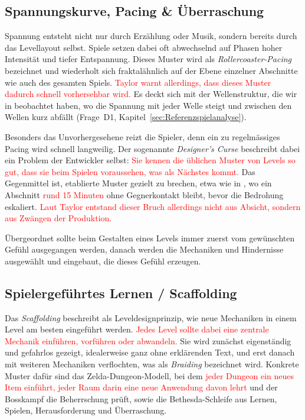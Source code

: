\documentclass[../Main.tex]{subfiles}
\begin{document}
\subsection{Spannungskurve, Pacing \& Überraschung} \label{sec:Pacing}
Spannung entsteht nicht nur durch Erzählung oder Musik, sondern bereits durch das Levellayout selbst. Spiele setzen dabei oft abwechselnd auf Phasen hoher Intensität und tiefer Entspannung. Dieses Muster wird als \textit{Rollercoaster-Pacing} bezeichnet und wiederholt sich fraktalähnlich auf der Ebene einzelner Abschnitte wie auch des gesamten Spiels. \textcolor{red}{Taylor warnt allerdings, dass dieses Muster dadurch schnell vorhersehbar wird.}\autocite{gdc_tenprinciples2010} Es deckt sich mit der Wellenstruktur, die wir in  beobachtet haben, wo die Spannung mit jeder Welle steigt und zwischen den Wellen kurz abfällt (Frage~D1, Kapitel~\ref{sec:Referenzspielanalyse}).

Besonders das Unvorhergesehene reizt die Spieler, denn ein zu regelmässiges Pacing wird schnell langweilig. Der sogenannte \textit{Designer's Curse} beschreibt dabei ein Problem der Entwickler selbst: \textcolor{red}{Sie kennen die üblichen Muster von Levels so gut, dass sie beim Spielen voraussehen, was als Nächstes kommt.} Das Gegenmittel ist, etablierte Muster gezielt zu brechen, etwa wie in ,\autocite{visceral_deadspace2_2011} wo ein Abschnitt \textcolor{red}{rund 15 Minuten} ohne Gegnerkontakt bleibt, bevor die Bedrohung eskaliert. \textcolor{red}{Laut Taylor entstand dieser Bruch allerdings nicht aus Absicht, sondern aus Zwängen der Produktion.}\autocite{gdc_tenprinciples2010}

Übergeordnet sollte beim Gestalten eines Levels immer zuerst vom gewünschten Gefühl ausgegangen werden, danach werden die Mechaniken und Hindernisse ausgewählt und eingebaut, die dieses Gefühl erzeugen.\autocite{gdc_tenprinciples2010}

\subsection{Spielergeführtes Lernen / Scaffolding} \label{sec:Scaffolding}
Das \textit{Scaffolding} beschreibt als Leveldesignprinzip, wie neue Mechaniken in einem Level am besten eingeführt werden.\autocite[114]{totten2014architectural} \textcolor{red}{Jedes Level sollte dabei eine zentrale Mechanik einführen, vorführen oder abwandeln.}\autocite{gdc_tenprinciples2010} Sie wird zunächst eigenständig und gefahrlos gezeigt, idealerweise ganz ohne erklärenden Text, und erst danach mit weiteren Mechaniken verflochten, was als \textit{Braiding} bezeichnet wird.\autocite{gdc_movingmountains2020} Konkrete Muster dafür sind das Zelda-Dungeon-Modell, bei dem \textcolor{red}{jeder Dungeon ein neues Item einführt, jeder Raum darin eine neue Anwendung davon lehrt} und der Bosskampf die Beherrschung prüft, sowie die Bethesda-Schleife aus Lernen, Spielen, Herausforderung und Überraschung.\autocite{gdc_tenprinciples2010}
\end{document}
